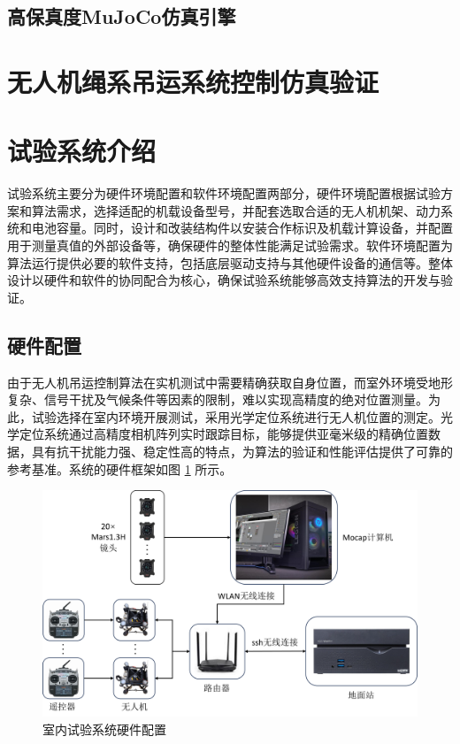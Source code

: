 \documentclass[lang=chs, degree=master, blindreview=false, winfonts=true]{yanputhesis}
\begin{document}
\subsection{高保真度MuJoCo仿真引擎}

\section{无人机绳系吊运系统控制仿真验证}
\section{试验系统介绍}

试验系统主要分为硬件环境配置和软件环境配置两部分，硬件环境配置根据试验方案和算法需求，选择适配的机载设备型号，并配套选取合适的无人机机架、动力系统和电池容量。同时，设计和改装结构件以安装合作标识及机载计算设备，并配置用于测量真值的外部设备等，确保硬件的整体性能满足试验需求。软件环境配置为算法运行提供必要的软件支持，包括底层驱动支持与其他硬件设备的通信等。整体设计以硬件和软件的协同配合为核心，确保试验系统能够高效支持算法的开发与验证。
\subsection{硬件配置}
由于无人机吊运控制算法在实机测试中需要精确获取自身位置，而室外环境受地形复杂、信号干扰及气候条件等因素的限制，难以实现高精度的绝对位置测量。为此，试验选择在室内环境开展测试，采用光学定位系统进行无人机位置的测定。光学定位系统通过高精度相机阵列实时跟踪目标，能够提供亚毫米级的精确位置数据，具有抗干扰能力强、稳定性高的特点，为算法的验证和性能评估提供了可靠的参考基准。系统的硬件框架如图 \ref{framework} 所示。
\begin{figure}[hbt!]
	\centering
	\includegraphics[width=36pc]{picture/5_4.png} 
	\caption{室内试验系统硬件配置} \label{framework}
\end{figure}
\end{document}
